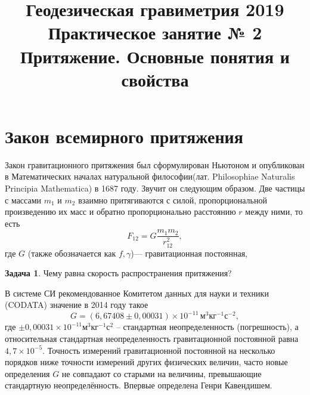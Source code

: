 \documentclass[11pt, a4paper]{article}
\title{{\Large Геодезическая гравиметрия 2019}\\ 
    {\bf\Large Практическое занятие № 2} \\
{\Large Притяжение. Основные понятия и свойства}}
\author{}
\date{\DTMusedate{lessondate}}
\theoremstyle{plain}
\theoremstyle{definition}
\newtheorem{problem}{Задача}[section]
\theoremstyle{remark}
\begin{document}
\maketitle

\section{Закон всемирного притяжения}

Закон гравитационного притяжения был сформулирован Ньютоном и опубликован в Математических началах
натуральной философии\cite{Newton1687}(лат. Philosophiae Naturalis Principia Mathematica) в 1687
году.
Звучит он следующим образом. Две частицы с массами $m_1$ и $m_2$ взаимно притягиваются с силой,
пропорциональной произведению их масс и обратно пропорционально расстоянию $r$ между ними, то есть
\begin{equation*}
    F_{12} = G\dfrac{m_1m_2}{r_{12}^2},
\end{equation*}
где $G$ (также обозначается как $f, \gamma$)--- гравитационная постоянная, 

\begin{problem}
    Чему равна скорость распространения притяжения?
\end{problem}

В системе СИ рекомендованное Комитетом данных для науки и техники (CODATA) значение в 2014
году\cite{CODATA2014} такое
\begin{equation*}
    G = (6,67408 \pm 0,00031)\times10^{-11}\,\text{м}^3\text{кг}^{-1}\text{с}^{-2},
\end{equation*}
где $\pm0,00031\times10^{-11}\text{м}^3\text{кг}^{-1}\text{с}^2$ -- стандартная неопределенность
(погрешность), а относительная стандартная неопределенность гравитационной постоянной
равна $4,7\times10^{-5}$. Точность измерений гравитационной постоянной на несколько порядков ниже
точности измерений других физических величин,  часто новые определения $G$ не совпадают со старыми
на величины, превышающие стандартную неопределённость. Впервые определена Генри Кавендишем.
\end{document}

